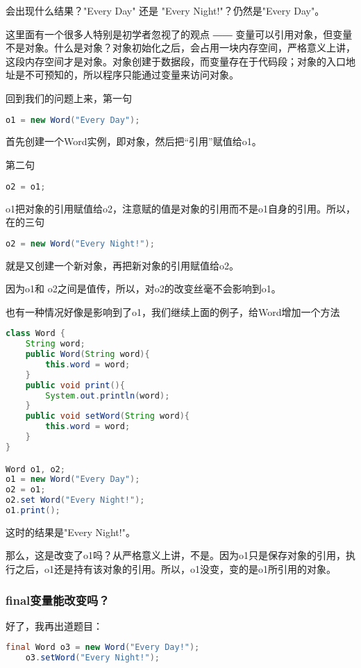 \documentclass[10pt,b5paper]{article}
\begin{document}
会出现什么结果？"Every Day" 还是 "Every Night!"？仍然是"Every Day"。

这里面有一个很多人特别是初学者忽视了的观点 ―― 变量可以引用对象，但变量不是对象。什么是对象？对象初始化之后，会占用一块内存空间，严格意义上讲，这段内存空间才是对象。对象创建于数据段，而变量存在于代码段；对象的入口地址是不可预知的，所以程序只能通过变量来访问对象。

回到我们的问题上来，第一句
\begin{lstlisting}[language=java]
o1 = new Word("Every Day");
\end{lstlisting}

首先创建一个Word实例，即对象，然后把“引用”赋值给o1。

第二句
\begin{lstlisting}[language=java]
o2 = o1;
\end{lstlisting}

o1把对象的引用赋值给o2，注意赋的值是对象的引用而不是o1自身的引用。所以，在的三句
\begin{lstlisting}[language=java]
    o2 = new Word("Every Night!");
\end{lstlisting}

就是又创建一个新对象，再把新对象的引用赋值给o2。

因为o1和 o2之间是值传，所以，对o2的改变丝毫不会影响到o1。

也有一种情况好像是影响到了o1，我们继续上面的例子，给Word增加一个方法
\begin{lstlisting}[language=java]
class Word {
    String word;
    public Word(String word){
        this.word = word;
    }
    public void print(){
        System.out.println(word);
    }
    public void setWord(String word){
        this.word = word;
    }
}

Word o1, o2;
o1 = new Word("Every Day");
o2 = o1;
o2.set Word("Every Night!");
o1.print();
\end{lstlisting}

这时的结果是"Every Night!"。

那么，这是改变了o1吗？从严格意义上讲，不是。因为o1只是保存对象的引用，执行之后，o1还是持有该对象的引用。所以，o1没变，变的是o1所引用的对象。
\subsubsection{final变量能改变吗？}
\label{sec-1-8-4}
好了，我再出道题目：
\begin{lstlisting}[language=java]
    final Word o3 = new Word("Every Day!");
    o3.setWord("Every Night!");
\end{lstlisting}
\end{document}
